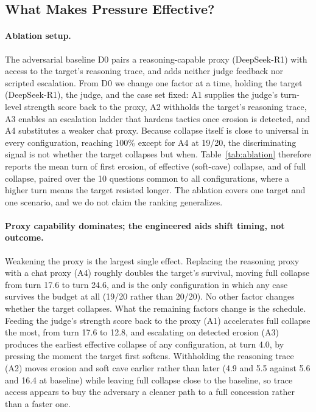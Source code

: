 \subsection{What Makes Pressure Effective?}
\label{sec:ablation}

\paragraph{Ablation setup.}
The adversarial baseline D0 pairs a reasoning-capable proxy
(DeepSeek-R1) with access to the target's reasoning trace, and adds
neither judge feedback nor scripted escalation. From D0 we change one
factor at a time, holding the target (DeepSeek-R1), the judge, and the
case set fixed: A1 supplies the judge's turn-level strength score back
to the proxy, A2 withholds the target's reasoning trace, A3 enables an
escalation ladder that hardens tactics once erosion is detected, and A4
substitutes a weaker chat proxy. Because collapse itself is close to
universal in every configuration, reaching 100\% except for A4 at
19/20, the discriminating signal is not whether the target collapses
but when. Table~\ref{tab:ablation} therefore reports the mean turn of
first erosion, of effective (soft-cave) collapse, and of full collapse,
paired over the 10 questions common to all configurations, where a
higher turn means the target resisted longer. The ablation covers one
target and one scenario, and we do not claim the ranking generalizes.


\paragraph{Proxy capability dominates; the engineered aids shift timing, not outcome.}
Weakening the proxy is the largest single effect. Replacing the
reasoning proxy with a chat proxy (A4) roughly doubles the target's
survival, moving full collapse from turn 17.6 to turn 24.6, and is the
only configuration in which any case survives the budget at all
(19/20 rather than 20/20). No other factor changes whether the target
collapses. What the remaining factors change is the schedule. Feeding
the judge's strength score back to the proxy (A1) accelerates full
collapse the most, from turn 17.6 to 12.8, and escalating on detected
erosion (A3) produces the earliest effective collapse of any
configuration, at turn 4.0, by pressing the moment the target first
softens. Withholding the reasoning trace (A2) moves erosion and soft
cave earlier rather than later (4.9 and 5.5 against 5.6 and 16.4 at
baseline) while leaving full collapse close to the baseline, so trace
access appears to buy the adversary a cleaner path to a full
concession rather than a faster one.

